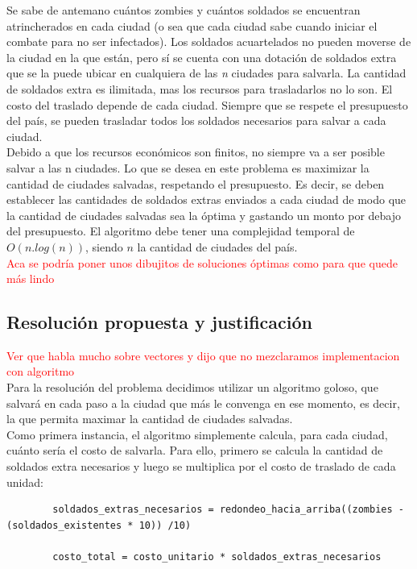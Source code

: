 \documentclass[a4paper]{article}
\begin{document}
Se sabe de antemano cu\'antos zombies y cu\'antos soldados se encuentran atrincherados en cada ciudad (o sea que cada ciudad sabe cuando iniciar el combate para no ser infectados). Los soldados acuartelados no pueden moverse de la ciudad en la que est\'an, pero s\'i se cuenta con una dotaci\'on de soldados extra que se la puede ubicar en cualquiera de las \emph{n} ciudades para salvarla. La cantidad de soldados extra es ilimitada, mas los recursos para trasladarlos no lo son. El costo del traslado depende de cada ciudad. Siempre que se respete el presupuesto del pa\'is, se pueden trasladar todos los soldados necesarios para salvar a cada ciudad.\\

Debido a que los recursos econ\'omicos son finitos, no siempre va a ser posible salvar a las n ciudades. Lo que se desea en este problema es maximizar la cantidad de ciudades salvadas, respetando el presupuesto. Es decir, se deben establecer las cantidades de soldados extras enviados a cada ciudad de modo que la cantidad de ciudades salvadas sea la \'optima y gastando un monto por debajo del presupuesto.  El algoritmo debe tener una complejidad temporal de $O(n.log(n))$, siendo $n$ la cantidad de ciudades del pa\'is.\\

\textcolor{red}{Aca se podr\'ia poner unos dibujitos de soluciones \'optimas como para que quede m\'as lindo}


\newpage
\subsection{Resoluci\'on propuesta y justificaci\'on}

\textcolor{red}{Ver que habla mucho sobre vectores y dijo que no mezclaramos implementacion con algoritmo}\\

Para la resoluci\'on del problema decidimos utilizar un algoritmo goloso, que salvar\'a en cada paso a la ciudad que m\'as le convenga en ese momento, es decir, la que permita maximar la cantidad de ciudades salvadas.\\

Como primera instancia, el algoritmo simplemente calcula, para cada ciudad, cu\'anto ser\'ia el costo de salvarla. Para ello, primero se calcula la cantidad de soldados extra necesarios y luego se multiplica por el costo de traslado de cada unidad:\\


	\begin{codesnippet}
	\begin{verbatim}
		soldados_extras_necesarios = redondeo_hacia_arriba((zombies - (soldados_existentes * 10)) /10)
		
		costo_total = costo_unitario * soldados_extras_necesarios
	\end{verbatim}
	\end{codesnippet}
\end{document}

